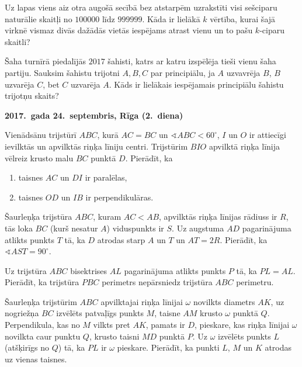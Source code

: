 \documentclass[11pt]{article}
\begin{document}
\begin{problem}[BwTst2017.7]
Uz lapas viens aiz otra augošā secībā bez atstarpēm uzrakstīti visi sešciparu 
naturālie skaitļi no $100000$ līdz $999999$. Kāda ir lielākā $k$ vērtība, kurai 
šajā virknē vismaz divās dažādās vietās iespējams atrast vienu un to pašu 
$k$-ciparu skaitli?
\end{problem}

\begin{problem}[BwTst2017.8]
Šaha turnīrā piedalījās $2017$ šahisti, katrs ar katru izspēlēja tieši vienu šaha
partiju. Sauksim šahistu trijotni $A,B,C$ par principiālu, ja $A$ uzvavrēja $B$, 
$B$ uzvarēja $C$, bet $C$ uzvarēja $A$. Kāds ir lielākais iespējamais principiālu 
šahistu trijotņu skaits? 
\end{problem}




\begin{center}
{\bf 2017.\ gada 24.\ septembris, Rīga (2.\ diena)}
\end{center}

\begin{problem}[BwTst2017.9]
Vienādsānu trijstūrī $ABC$, kurā $AC=BC$ un $\sphericalangle{}ABC < 60^{\circ}$, 
$I$ un $O$ ir attiecīgi ievilktās un apvilktās riņķa līniju centri. 
Trijstūrim $BIO$ apvilktā riņķa līnija vēlreiz krusto malu $BC$ punktā $D$. 
Pierādīt, ka 
\begin{enumerate}
\item taisnes $AC$ un $DI$ ir paralēlas, 
\item taisnes $OD$ un $IB$ ir perpendikulāras.
\end{enumerate}
\end{problem}


\begin{problem}[BwTst2017.10]
Šaurleņķa trijstūra $ABC$, kuram $AC < AB$, apvilktās riņķa līnijas rādiuss ir $R$, 
tās loka $BC$ (kurš nesatur $A$) viduspunkts ir $S$. Uz augstuma $AD$ pagarinājuma 
atlikts punkts $T$ tā, ka $D$ atrodas starp $A$ un $T$ un $AT = 2R$. 
Pierādīt, ka $\sphericalangle{} AST = 90^{\circ}$. 
\end{problem}

\begin{problem}[BwTst2017.11]
Uz trijstūra $ABC$ bisektrises $AL$ pagarinājuma atlikts punkts $P$ tā, ka 
$PL = AL$. Pierādīt, ka trijstūra $PBC$ perimetrs nepārsniedz trijstūra $ABC$ perimetru. 
\end{problem}

\begin{problem}[BwTst2017.12]
Šaurleņķa trijstūrim $ABC$ apvilktajai riņķa līnijai $\omega$ novilkts diametrs $AK$, 
uz nogriežņa $BC$ izvēlēts patvaļīgs punkts $M$, taisne $AM$ krusto $\omega$ punktā $Q$. 
Perpendikula, kas no $M$ vilkts pret $AK$, pamats ir $D$, pieskare, kas riņķa līnijai 
$\omega$ novilkta caur punktu $Q$, krusto taisni $MD$ punktā $P$. 
Uz $\omega$ izvēlēts punkts $L$ (atšķirīgs no $Q$) tā, ka $PL$ ir $\omega$ pieskare. 
Pierādīt, ka punkti $L$, $M$ un $K$ atrodas uz vienas taisnes. 
\end{problem}
\end{document}
